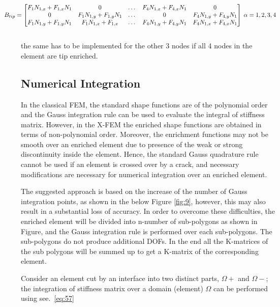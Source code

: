 \documentclass[fleqn, 12.5pt,a4paper]{report}
\begin{document}
\begin{align}\label{eq:56}
\hspace{-1cm}B_{tip} = \begin{bmatrix}
F_1 N_{1,x} + F_{1,x} N_1 & 0 & \dots  & F_4 N_{1,x} + F_{4,x} N_1 & 0\\
0 & F_1 N_{1,y} + F_{1,y} N_1 & \dots & 0 & F_4 N_{1,y} + F_{4,y} N_1\\
F_1 N_{1,y} + F_{1,y} N_1 & F_1 N_{1,x} + F_{1,x} & \dots & F_4 N_{1,y} + F_{4,y} N_1 & F_4 N_{1,x} + F_{4,x} N_1
\end{bmatrix}
\: \alpha = 1,2,3,4
\end{align}
\\
the same has to be implemented for the other 3 nodes if all 4 nodes in the element are tip enriched.

\subsection{Numerical Integration}

In the classical FEM, the standard shape functions are of the polynomial order and the Gauss integration rule can be used to evaluate the integral of stiffness matrix. However, in the X-FEM the enriched shape functions are obtained in terms of non-polynomial order. Moreover, the enrichment functions may not be smooth over an enriched element due to presence of the weak or strong discontinuity inside the element. Hence, the standard Gauss quadrature rule cannot be used if an element is crossed over by a crack, and necessary modifications are necessary for numerical integration over an enriched element\cite{khoei2014extended}. \par

The suggested approach is based on the increase of the
number of Gauss integration points\cite{khoei2014extended}, as shown in the below Figure \autoref{fig:9}, however, this  may also result in a substantial loss of accuracy. In order to overcome these difficulties, the enriched element will be divided into n-number of sub-polygons 
as shown in Figure, and the Gauss integration rule is performed over each sub-polygons. The sub-polygons do not produce additional DOFs\cite{khoei2014extended}. In the end all the K-matrices of the sub polygons will be summed up to get a K-matrix of the corresponding element.\par
Consider an element cut by an interface into two distinct parts, $\Omega+$ and $\Omega-$; the integration of stiffness matrix  over a domain (element) $\Omega$ can be performed using see.~\autoref{eq:57}
\end{document}
